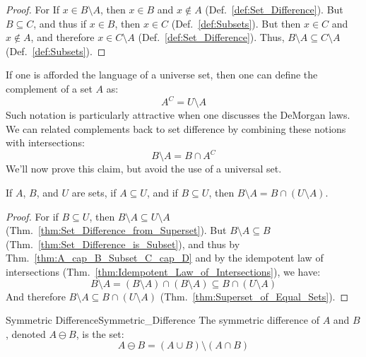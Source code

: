         \begin{proof}
            For If $x\in{B}\setminus{A}$, then $x\in{B}$ and $x\notin{A}$
            (Def.~\ref{def:Set_Difference}). But $B\subseteq{C}$, and thus
            if $x\in{B}$, then $x\in{C}$ (Def.~\ref{def:Subsets}). But then
            $x\in{C}$ and $x\notin{A}$, and therefore $x\in{C}\setminus{A}$
            (Def.~\ref{def:Set_Difference}). Thus,
            $B\setminus{A}\subseteq{C}\setminus{A}$ (Def.~\ref{def:Subsets}).
        \end{proof}
        If one is afforded the language of a universe set, then one can define
        the complement of a set $A$ as:
        \begin{equation}
            A^{C}=U\setminus{A}
        \end{equation}
        Such notation is particularly attractive when one discusses the
        DeMorgan laws. We can related complements back to set difference by
        combining these notions with intersections:
        \begin{equation}
            B\setminus{A}=B\cap{A}^{C}
        \end{equation}
        We'll now prove this claim, but avoid the use of a universal set.
        \begin{theorem}
            If $A$, $B$, and $U$ are sets, if $A\subseteq{U}$, and if
            $B\subseteq{U}$, then $B\setminus{A}=B\cap(U\setminus{A})$.
        \end{theorem}
        \begin{proof}
            For if $B\subseteq{U}$, then $B\setminus{A}\subseteq{U}\setminus{A}$
            (Thm.~\ref{thm:Set_Difference_from_Superset}). But
            $B\setminus{A}\subseteq{B}$
            (Thm.~\ref{thm:Set_Difference_is_Subset}), and thus by
            Thm.~\ref{thm:A_cap_B_Subset_C_cap_D} and by the idempotent law of
            intersections (Thm.~\ref{thm:Idempotent_Law_of_Intersections}),
            we have:
            \begin{equation}
                B\setminus{A}=(B\setminus{A})\cap(B\setminus{A})
                    \subseteq{B}\cap(U\setminus{A})
            \end{equation}
            And therefore $B\setminus{A}\subseteq{B}\cap(U\setminus{A})$
            (Thm.~\ref{thm:Superset_of_Equal_Sets}).
        \end{proof}
        \begin{fdefinition}{Symmetric Difference}{Symmetric_Difference}
            The symmetric difference of $A$ and $B$, denoted $A\ominus{B}$, is
            the set:
            \begin{equation*}
                A\ominus{B}
                =(A\cup{B})\setminus(A\cap{B})
            \end{equation*}
        \end{fdefinition}
